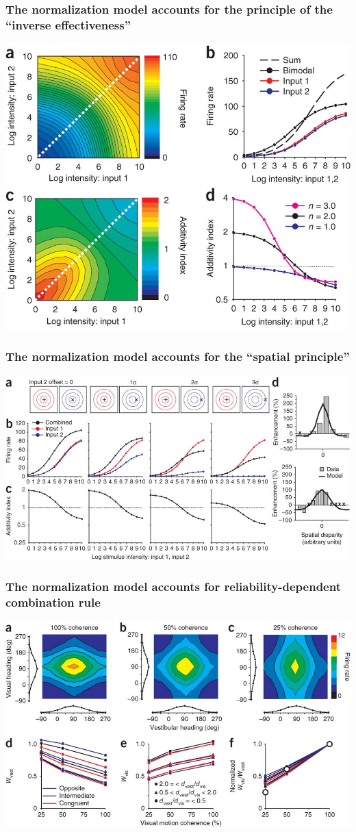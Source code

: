 \documentclass{beamer}
\begin{document}
\begin{frame}
  \frametitle{The normalization model accounts for the principle of the ``inverse effectiveness''}
  \begin{center}
    \includegraphics[width=.6\textwidth]{inverse2}
  \end{center}
\end{frame}

\begin{frame}
  \frametitle{The normalization model accounts for the ``spatial principle''}
  \begin{center}
    \includegraphics[width=\textwidth]{spatial}
  \end{center}
\end{frame}

\begin{frame}
  \frametitle{The normalization model accounts for reliability-dependent combination rule}
  \begin{center}
    \includegraphics[width=.9\textwidth]{normweight}
  \end{center}
\end{frame}
\end{document}
